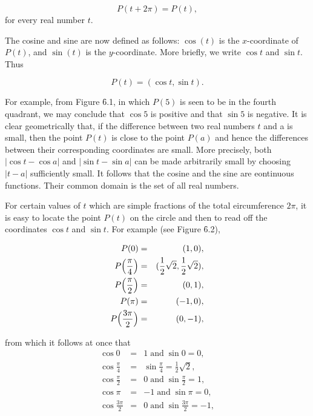 \begin{equation}
P(t + 2\pi) = P(t), 
\label{eq6.1.1}
\end{equation}
\noindent for every real number $t$.  
 

The cosine and sine are now defined as follows: $\cos(t)$ is the $x$-coordinate of $P(t)$, and $\sin(t)$ is the $y$-coordinate. More briefly, we write $\cos t$ and $\sin t$. Thus

$$
P(t) = (\cos t, \sin t).  
$$

\noindent For example, from Figure \f{6.1}, in which $P(5)$ is seen to be in the fourth quadrant, we may
conclude that $\cos 5$ is positive and that $\sin 5$ is negative. It is clear geometrically that, if the
difference between two real numbers $t$ and a is small, then the point $P(t)$ is close to the point
$P(a)$ and hence the differences between their corresponding coordinates are small. More precisely, both $| \cos t - \cos a |$ and $| \sin t - \sin a|$ can be made arbitrarily small by choosing $|t - a|$ sufficiently small. It follows that the cosine and the sine are eontinuous functions. Their
common domain is the set of all real numbers.

For certain values of $t$ which are simple fractions of the total eircumference $2\pi$, it is easy to
locate the point $P(t)$ on the circle and then to read off the coordinates $\cos t$ and $\sin t$. For example (see Figure \f{6.2}),

\begin{eqnarray*}
                P(0) &=& (1,0),\\
P \Bigl(\frac{\pi}{4} \Bigr) &=& (\frac{1}{2} \sqrt2, \frac{1}{2} \sqrt2),\\
 P \Bigl(\frac{\pi}{2}\Bigr) &=& (0, 1),\\
                               P(\pi) &=& (-1, 0),\\
P \Bigl(\frac{3\pi}{2}\Bigr) &=& (0, -1), 
\end{eqnarray*}

\noindent from which it follows at once that 
\begin{eqnarray*}
                \cos 0 &=& 1 \;\mbox{and}\; \sin 0 = 0, \\
 \cos \frac{\pi}{4} &=&  \sin \frac{\pi}{4} = \frac{1}{2} \sqrt2,\\
 \cos \frac{\pi}{2} &=& 0 \;\mbox{and}\; \sin \frac{\pi}{2} = 1, \\
               \cos \pi &=& -1 \;\mbox{and}\; \sin \pi = 0, \\
\cos \frac{3\pi}{2} &=& 0 \;\mbox{and}\; \sin \frac{3\pi}{2} = -1, 
\end{eqnarray*}

